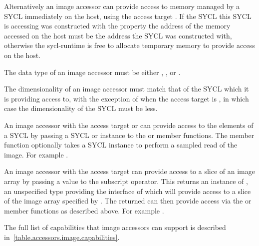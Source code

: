 Alternatively an image accessor can provide access to memory managed by a SYCL
 immediately on the \gls{host}, using the access target
. If the SYCL  this
SYCL  is accessing was constructed with the property 
 the address of the memory accessed
on the \gls{host} must be the address the SYCL  was
constructed with, otherwise the \gls{sycl-runtime} is free to allocate
temporary memory to provide access on the \gls{host}.

The data type of an image accessor must be either , ,  or .

The dimensionality of an image accessor must match that of the SYCL
 which it is providing access to, with the exception of when
the access target is , in which case
the dimensionality of the SYCL  must be 
less.

An image accessor with the access target  or
 can provide access to the elements of a
SYCL  by passing a SYCL  or  instance to the  or  member
functions. The  member function optionally takes a SYCL
 instance to perform a sampled read of the image. For
example .

An image accessor with the access target  can provide access to a slice of an image array by
passing a  value to the subscript operator. This returns an
instance of , an unspecified type providing
the interface of  which will provide access
to a slice of the image array specified by . The
 returned can then provide access via the
 or  member functions as described above. For
example .

The full list of capabilities that image accessors can support is described
in~\ref{table.accessors.image.capabilities}.

